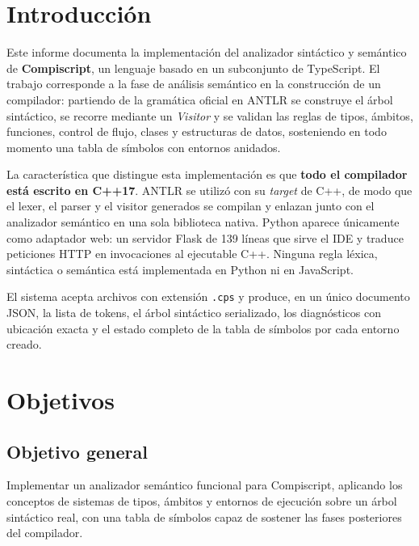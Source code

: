 \documentclass[11pt,a4paper]{article}
\begin{document}
\tableofcontents
\newpage

\section{Introducción}

Este informe documenta la implementación del analizador sintáctico y semántico
de \textbf{Compiscript}, un lenguaje basado en un subconjunto de TypeScript. El
trabajo corresponde a la fase de análisis semántico en la construcción de un
compilador: partiendo de la gramática oficial en ANTLR se construye el árbol
sintáctico, se recorre mediante un \emph{Visitor} y se validan las reglas de
tipos, ámbitos, funciones, control de flujo, clases y estructuras de datos,
sosteniendo en todo momento una tabla de símbolos con entornos anidados.

La característica que distingue esta implementación es que \textbf{todo el
compilador está escrito en C++17}. ANTLR se utilizó con su \emph{target} de C++,
de modo que el lexer, el parser y el visitor generados se compilan y enlazan
junto con el analizador semántico en una sola biblioteca nativa. Python aparece
únicamente como adaptador web: un servidor Flask de 139 líneas que sirve el IDE
y traduce peticiones HTTP en invocaciones al ejecutable C++. Ninguna regla
léxica, sintáctica o semántica está implementada en Python ni en JavaScript.

El sistema acepta archivos con extensión \texttt{.cps} y produce, en un único
documento JSON, la lista de tokens, el árbol sintáctico serializado, los
diagnósticos con ubicación exacta y el estado completo de la tabla de símbolos
por cada entorno creado.

\section{Objetivos}

\subsection{Objetivo general}

Implementar un analizador semántico funcional para Compiscript, aplicando los
conceptos de sistemas de tipos, ámbitos y entornos de ejecución sobre un árbol
sintáctico real, con una tabla de símbolos capaz de sostener las fases
posteriores del compilador.
\end{document}
